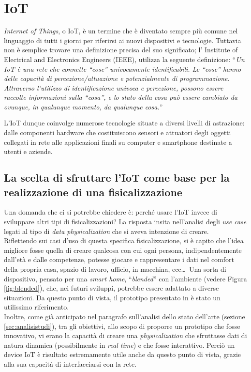 \documentclass[12pt,a4paper]{report}
\begin{document}
\section{IoT}
\emph{Internet of Things}, o IoT, è un termine che è diventato sempre più comune nel linguaggio di tutti i giorni per riferirsi ai nuovi dispositivi e tecnologie. Tuttavia non è semplice trovare una definizione precisa del suo significato; l' Institute of Electrical and Electronics Engineers (IEEE), utilizza la seguente definizione: ``\emph{Un IoT è una rete che connette ``cose'' univocamente identificabili. Le ``cose'' hanno delle capacità di percezione/attuazione e potenzialmente di programmazione. Attraverso l'utilizzo di identificazione univoca e percezione, possono essere raccolte informazioni sulla ``cosa'', e lo stato della cosa può essere cambiato da ovunque, in qualunque momento, da qualunque cosa.}''\cite{IEEEIoTDefinition}

L'IoT dunque coinvolge numerose tecnologie situate a diversi livelli di astrazione: dalle componenti hardware che costituiscono sensori e attuatori degli oggetti collegati in rete alle applicazioni finali su computer e smartphone destinate a utenti e aziende.


\subsection{La scelta di sfruttare l'IoT come base per la realizzazione di una fisicalizzazione}

Una domanda che ci si potrebbe chiedere è: perché usare l'IoT invece di sviluppare altri tipi di fisicalizzazioni? La risposta insita nell'analisi degli \textit{use case} legati al tipo di \textit{data physicalization} che si aveva intenzione di creare. \\
Riflettendo sui casi d'uso di questa specifica fisicalizzazione, si è capito che l'idea migliore fosse quella di creare qualcosa con cui ogni persona, indipendentemente dall'età e dalle competenze, potesse giocare e rappresentare i dati nel comfort della propria casa, spazio di lavoro, ufficio, in macchina, ecc\dots\ Una sorta di  dispositivo, pensato per una \textit{smart home}, ``\textit{blended}'' con l'ambiente (vedere Figura \ref{fig:blended}), che, nei futuri sviluppi, potrebbe essere adattato a diverse situazioni. Da questo punto di vista, il prototipo presentato in \cite{houben2016physikit} è stato un utilissimo riferimento.\\
Inoltre, come già anticipato nel paragrafo sull'analisi dello stato dell'arte (sezione \ref{sec:analisistudi}), tra gli obiettivi, allo scopo di proporre un prototipo che fosse innovativo, vi erano la capacità di creare una \textit{physicalization} che sfruttasse dati di natura dinamica (possibilmente in \textit{real time}) e che fosse interattivo. Perciò un device IoT è risultato estremamente utile anche da questo punto di vista, grazie alla sua capacità di interfacciarsi con la rete. 
\end{document}
